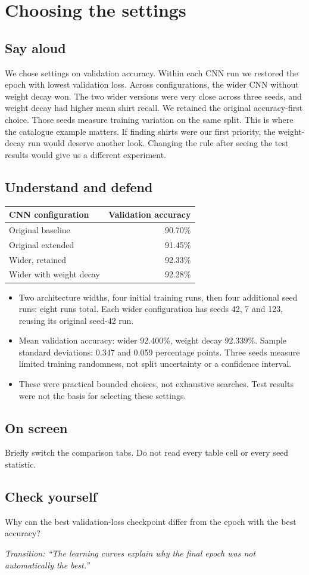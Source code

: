\documentclass[11pt,a4paper]{article}
\newcommand{\slide}[3]{\clearpage{\small\color{olive}SLIDE #1\hfill Target: #3}\par\section{#2}}
\newcommand{\say}{\subsection{Say aloud}}
\newcommand{\understand}{\subsection{Understand and defend}}
\newcommand{\screen}{\subsection{On screen}}
\newcommand{\selfcheck}[1]{\subsection{Check yourself}#1}
\newcommand{\transition}[1]{\par\smallskip\textit{Transition: #1}}
\begin{document}
\slide{9}{Choosing the settings}{45 seconds}
\say
We chose settings on validation accuracy. Within each CNN run we restored the epoch with lowest validation loss. Across configurations, the wider CNN without weight decay won. The two wider versions were very close across three seeds, and weight decay had higher mean shirt recall. We retained the original accuracy-first choice. Those seeds measure training variation on the same split. This is where the catalogue example matters. If finding shirts were our first priority, the weight-decay run would deserve another look. Changing the rule after seeing the test results would give us a different experiment.
\understand
\begin{tabularx}{\linewidth}{Xr}
\toprule CNN configuration & Validation accuracy\\\midrule
Original baseline & 90.70\%\\
Original extended & 91.45\%\\
Wider, retained & 92.33\%\\
Wider with weight decay & 92.28\%\\\bottomrule
\end{tabularx}
\begin{itemize}
\item Two architecture widths, four initial training runs, then four additional seed runs: eight runs total. Each wider configuration has seeds 42, 7 and 123, reusing its original seed-42 run.
\item Mean validation accuracy: wider 92.400\%, weight decay 92.339\%. Sample standard deviations: 0.347 and 0.059 percentage points. Three seeds measure limited training randomness, not split uncertainty or a confidence interval.
\item These were practical bounded choices, not exhaustive searches. Test results were not the basis for selecting these settings.
\end{itemize}
\screen
Briefly switch the comparison tabs. Do not read every table cell or every seed statistic.
\selfcheck{Why can the best validation-loss checkpoint differ from the epoch with the best accuracy?}
\transition{``The learning curves explain why the final epoch was not automatically the best.''}
\end{document}
